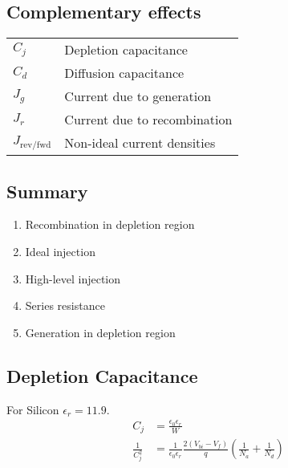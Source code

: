 \documentclass[a4paper, fontsize=8pt, landscape, DIV=1]{scrartcl}
\begin{document}
\begin{multicols*}{4}
    \section{Complementary effects}
    \begin{tabular}[h]{l l}
      $C_j$   & Depletion capacitance \\
      $C_d$   & Diffusion capacitance \\
      $J_g$   & Current due to generation \\
      $J_r$   & Current due to recombination \\
      $J_{\text{rev/fwd}}$ & Non-ideal current densities \\
    \end{tabular}

    \subsection{Summary}
    \renewcommand{\labelenumi}{\alph{enumi})}
    \setlength{\fboxsep}{1pt}
    \begin{enumerate}[topsep=0pt,itemsep=-1ex,partopsep=1ex,parsep=1ex]
    \item \colorbox[rgb]{0.99,0.90,0.77}{Recombination in depletion region}
    \item \colorbox[rgb]{0.84,0.93,0.81}{Ideal injection}
    \item \colorbox[rgb]{0.75,0.85,0.99}{High-level injection}
    \item \colorbox[rgb]{0.89,0.75,0.93}{Series resistance}
    \item \colorbox[rgb]{0.98,0.79,0.78}{Generation in depletion region}
    \end{enumerate}

    
    \subsection{Depletion Capacitance}
    For Silicon $\epsilon_r = 11.9$.
    \begin{align*}
      C_j &= \frac{\epsilon_0\epsilon_r}{W} \\
      \frac{1}{C_j^2} &= \frac{1}{\epsilon_0\epsilon_r} \frac{2(V_{bi}-V_f)}{q} \left( \frac{1}{N_a} + \frac{1}{N_d}\right) \\
    \end{align*}


\end{multicols*}
\end{document}
